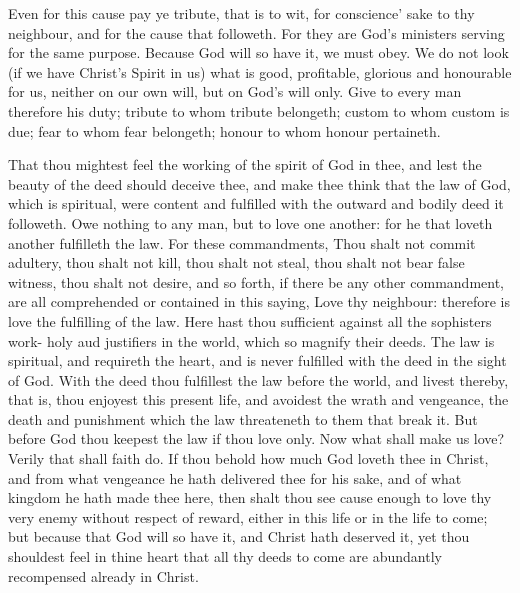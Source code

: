Even for this cause pay ye tribute, that is to wit, for conscience'
sake to thy neighbour, and for the cause that followeth.
For they are God's ministers serving for the same 
purpose. Because God will so have it, we must obey. 
We do not look (if we have Christ's Spirit in us) what is 
good, profitable, glorious and honourable for us, neither 
on our own will, but on God's will only. Give to every 
man therefore his duty; tribute to whom tribute belongeth;
custom to whom custom is due; fear to whom fear belongeth;
honour to whom honour pertaineth. 

That thou mightest feel the working of the spirit of 
God in thee, and lest the beauty of the deed should deceive
thee, and make thee think that the law of God, 
which is spiritual, were content and fulfilled with the outward
and bodily deed it followeth. Owe nothing to any 
man, but to love one another: for he that loveth another
fulfilleth the law. For these commandments, Thou 
shalt not commit adultery, thou shalt not kill, thou shalt 
not steal, thou shalt not bear false witness, thou shalt not 
desire, and so forth, if there be any other commandment,
are all comprehended or contained in this saying, Love 
thy neighbour: therefore is love the fulfilling of the law. 
Here hast thou sufficient against all the sophisters work- 
holy aud justifiers in the world, which so magnify their 
deeds. The law is spiritual, and requireth the heart, and 
is never fulfilled with the deed in the sight of God. With 
the deed thou fulfillest the law before the world, and 
livest thereby, that is, thou enjoyest this present life, and 
avoidest the wrath and vengeance, the death and punishment
which the law threateneth to them that break it. 
But before God thou keepest the law if thou love only. 
Now what shall make us love? Verily that shall faith 
do. If thou behold how much God loveth thee in Christ, 
and from what vengeance he hath delivered thee for his 
sake, and of what kingdom he hath made thee here, then 
shalt thou see cause enough to love thy very enemy without
respect of reward, either in this life or in the life to 
come; but because that God will so have it, and Christ 
hath deserved it, yet thou shouldest feel in thine heart 
that all thy deeds to come are abundantly recompensed 
already in Christ. 

